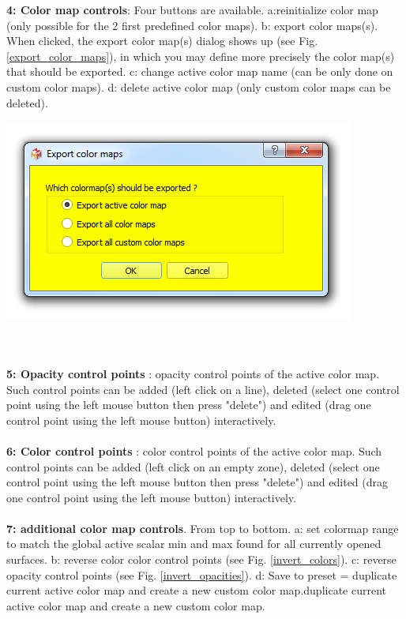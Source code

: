 \noindent
\begin{minipage}{0.5\textwidth}
\textbf{4: Color map controls}: Four buttons are available. a:reinitialize color map (only possible for the 2 first predefined color maps). b: export color maps(s). When clicked, the export color map(s) dialog shows up (see Fig. \ref{export_color_maps}), in which you may define more precisely the color map(s) that should be exported.  c: change active color map name (can be only done on custom color maps). d: delete active color map (only custom color maps can be deleted).\\
\end{minipage}    
\begin{minipage}{0.5\textwidth}\centering
  \includegraphics[scale=0.5]{images/11/export_color_maps.png}
\label{export_color_maps}
 \end{minipage} \\\\

\noindent
\textbf{5: Opacity control points }: opacity control points of the active color map. Such control points can be added (left click on a line), deleted (select one control point using the left mouse button then press "delete") and edited (drag one control point using the left mouse button) interactively.\\\\

\noindent
\textbf{6: Color control points }: color control points of the active color map. Such control points can be added (left click on an empty zone), deleted (select one control point using the left mouse button then press "delete") and edited (drag one control point using the left mouse button) interactively.\\\\
\noindent
\textbf{7: additional color map controls}. From top to bottom. a: set colormap range to match the global active scalar min and max found for all currently opened surfaces. b: reverse color color control points (see Fig. \ref{invert_colors}). c: reverse opacity control points (see Fig. \ref{invert_opacities}). d:  Save to preset = duplicate current active color map and create a new custom color map.duplicate current active color map and create a new custom color map. \\\\



